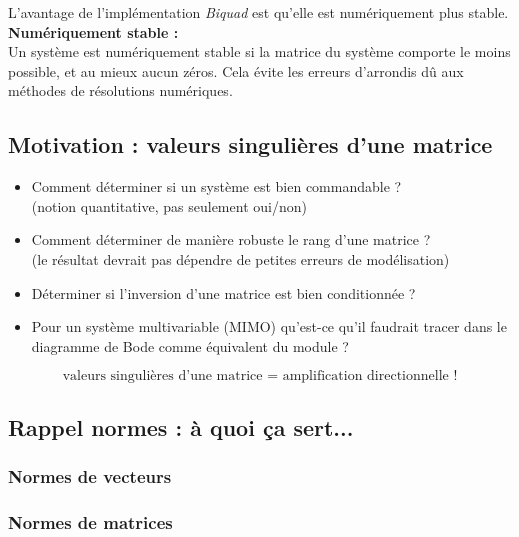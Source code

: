 \documentclass[document.tex]{subfiles}
\begin{document}
L'avantage de l'implémentation \textit{Biquad} est qu'elle est numériquement plus stable.\\

\textbf{Numériquement stable : }\\
Un système est numériquement stable si la matrice du système comporte le moins possible, et au mieux aucun zéros. Cela évite les erreurs d'arrondis dû aux méthodes de résolutions numériques.\\

\subsection{Motivation : valeurs singulières d'une matrice}

\begin{itemize}
\item Comment déterminer si un système est bien commandable ?\\
(notion quantitative, pas seulement oui/non)
\item Comment déterminer de manière robuste le rang d'une matrice ?\\
(le résultat devrait pas dépendre de petites erreurs de modélisation)
\item Déterminer si l'inversion d'une matrice est bien conditionnée ?
\item Pour un système multivariable (MIMO) qu'est-ce qu'il faudrait tracer dans le diagramme de Bode comme équivalent du module ?
\end{itemize}

$$\boxed{\text{valeurs singulières d'une matrice = amplification directionnelle !}}$$

\subsection{Rappel normes : à quoi ça sert...}


\subsubsection{Normes de vecteurs}


\subsubsection{Normes de matrices}
\end{document}
